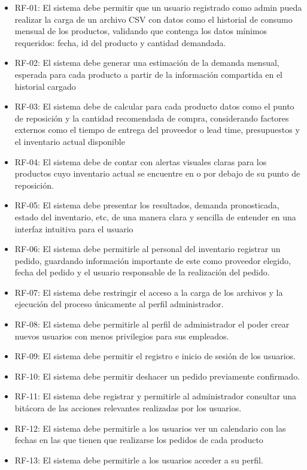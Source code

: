 \begin{itemize}
    \item RF-01: El sistema debe permitir que un usuario registrado como admin pueda realizar la carga de un archivo CSV con datos como el historial de consumo mensual de los productos, validando que contenga los datos mínimos requeridos: fecha, id del producto y cantidad demandada.
    \item RF-02: El sistema debe generar una estimación de la demanda mensual, esperada para cada producto a partir de la información compartida en el historial cargado
    \item RF-03: El sistema debe de calcular para cada producto datos como el punto de reposición y la cantidad recomendada de compra, considerando factores externos como el tiempo de entrega del proveedor o lead time, presupuestos y el inventario actual disponible
    \item RF-04: El sistema debe de contar con alertas visuales claras para los productos cuyo inventario actual se encuentre en o por debajo de su punto de reposición.
    \item RF-05: El sistema debe presentar los resultados, demanda pronosticada, estado del inventario, etc, de una manera clara y sencilla de entender en una interfaz intuitiva para el usuario
    \item RF-06: El sistema debe permitirle al personal del inventario registrar un pedido, guardando información importante de este como proveedor elegido, fecha del pedido y el usuario responsable de la realización del pedido.
    \item RF-07: El sistema debe restringir el acceso a la carga de los archivos y la ejecución del proceso únicamente al perfil administrador.
    \item RF-08: El sistema debe permitirle al perfil de administrador el poder crear nuevos usuarios con menos privilegios para sus empleados.
    \item RF-09: El sistema debe permitir el registro e inicio de sesión de los usuarios.
    \item RF-10: El sistema debe permitir deshacer un pedido previamente confirmado.
    \item RF-11: El sistema debe registrar y permitirle al administrador consultar una bitácora de las acciones relevantes realizadas por los usuarios.
    \item RF-12: El sistema debe permitirle a los usuarios ver un calendario con las fechas en las que tienen que realizarse los pedidos de cada producto
    \item RF-13: El sistema debe permitirle a los usuarios acceder a su perfil.
\end{itemize}

